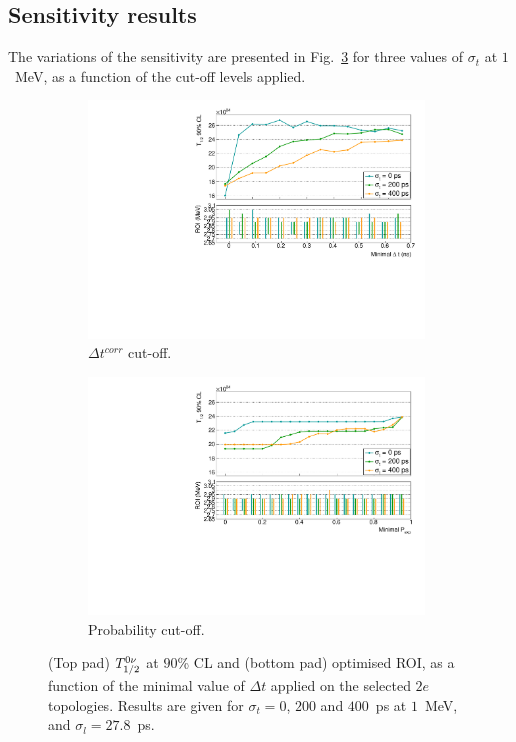 \subsection{Sensitivity results}

The variations of the sensitivity are presented in Fig.~\ref{fig:T12_cut} for three values of $\sigma_{t}$ at $1$~MeV, as a function of the cut-off levels applied.
\begin{figure}[!h]
\centering
\begin{subfigure}[t]{1\textwidth}
  \centering
  \includegraphics[width=0.98\textwidth]{timedifference/fig_timediff/compare_sigma_cut_delta_t_T12.pdf}
  \captionsetup{justification=justified}
  \caption{$\Delta t^{corr}$ cut-off.
    \label{subfig:T12_cut_deltat}}
\end{subfigure}
\begin{subfigure}[t]{1\textwidth}
  \centering
  \includegraphics[width=0.98\textwidth]{timedifference/fig_timediff/compare_sigma_cut_proba_T12.pdf}
  \captionsetup{justification=justified}
  \caption{Probability cut-off.
    \label{subfig:T12_cut_proba}}
\end{subfigure}
\caption{(Top pad) $T_{1/2}^{0\nu}$ at $90$\% CL and (bottom pad) optimised ROI, as a function of the minimal value of $\Delta t$ applied on the selected $2e$ topologies.
    Results are given for $\sigma_{t}=0$, $200$ and $400$~ps at $1$~MeV, and $\sigma_{l}=27.8$~ps.
  \label{fig:T12_cut}}
\end{figure}
